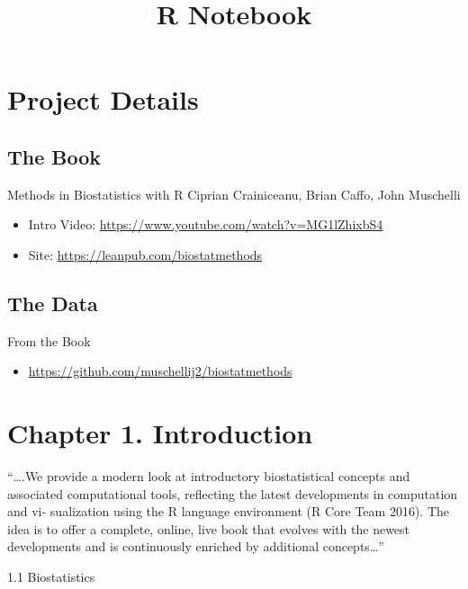 \documentclass[]{article}
\title{R Notebook}
\author{}
\date{}
\providecommand{\tightlist}{%
  \setlength{\itemsep}{0pt}\setlength{\parskip}{0pt}}
\begin{document}
\maketitle

\hypertarget{project-details}{%
\section{Project Details}\label{project-details}}

\hypertarget{the-book}{%
\subsection{The Book}\label{the-book}}

Methods in Biostatistics with R Ciprian Crainiceanu, Brian Caffo, John
Muschelli

\begin{itemize}
\tightlist
\item
  Intro Video: \url{https://www.youtube.com/watch?v=MG1lZhixbS4}
\item
  Site: \url{https://leanpub.com/biostatmethods}
\end{itemize}

\hypertarget{the-data}{%
\subsection{The Data}\label{the-data}}

From the Book

\begin{itemize}
\tightlist
\item
  \url{https://github.com/muschellij2/biostatmethods}
\end{itemize}

\hypertarget{chapter-1.-introduction}{%
\section{Chapter 1. Introduction}\label{chapter-1.-introduction}}

``\ldots{}.We provide a modern look at introductory biostatistical
concepts and associated computational tools, reflecting the latest
developments in computation and vi- sualization using the R language
environment (R Core Team 2016). The idea is to offer a complete, online,
live book that evolves with the newest developments and is continuously
enriched by additional concepts\ldots{}''

1.1 Biostatistics
\end{document}
